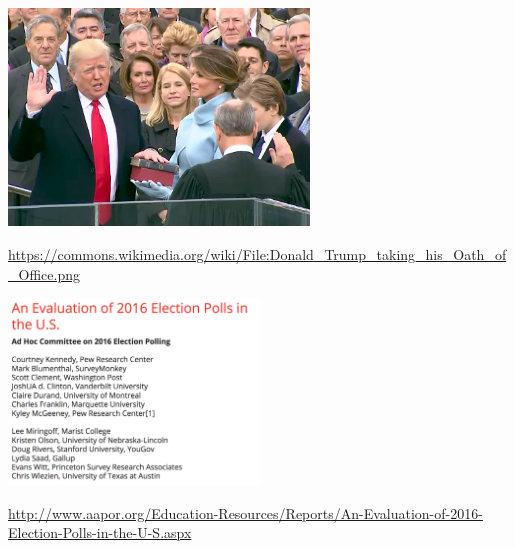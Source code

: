 \documentclass[aspectratio=169]{beamer}
\begin{document}
\begin{frame}

\begin{center}
\includegraphics[width=0.6\textwidth]{figures/trump_oath}
\end{center}

\vfill
\tiny{\textcolor{blue}{\url{https://commons.wikimedia.org/wiki/File:Donald_Trump_taking_his_Oath_of_Office.png}}}

\end{frame}
\begin{frame}

\begin{center}
\includegraphics[width=0.5\textwidth]{figures/aapor_2016_election_evaluation}
\end{center}

\vfill
\tiny{\url{http://www.aapor.org/Education-Resources/Reports/An-Evaluation-of-2016-Election-Polls-in-the-U-S.aspx}}

\end{frame}
\end{document}
